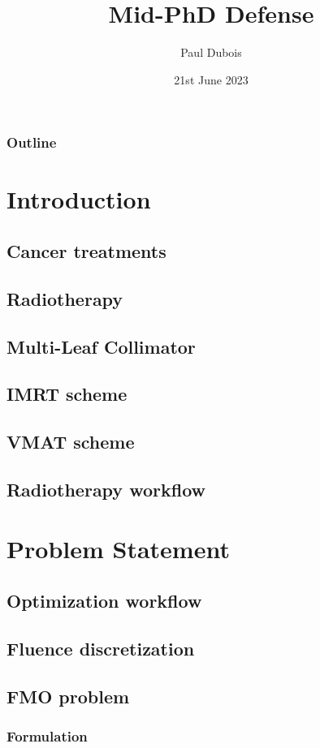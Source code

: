 \documentclass{beamer}
\title{Mid-PhD Defense}
\author{Paul Dubois}
\institute{
	TheraPanacea\\
	MICS, CentraleSupélec\\
	Institut du Cancer de Montpellier
}
\date{21st June 2023}
\begin{document}
	
	\frame{\titlepage}
	
	\begin{frame}
		\frametitle{Outline}
		\tableofcontents
	\end{frame}

	\section{Introduction}
	\subsection{Cancer treatments}
	\subsection{Radiotherapy}
	\subsection{Multi-Leaf Collimator}
	\subsection{IMRT scheme}
	\subsection{VMAT scheme}
	\subsection{Radiotherapy workflow}
	\section{Problem Statement}
	\subsection{Optimization workflow}
	\subsection{Fluence discretization}
	\subsection{FMO problem}
	\subsubsection{Formulation}
\end{document}
